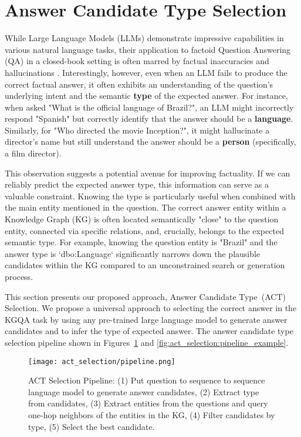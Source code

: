 \section{Answer Candidate Type Selection}
\label{sec:candidate_generation_type_selection}

While Large Language Models (LLMs) demonstrate impressive capabilities in various natural language tasks, their application to factoid Question Answering (QA) in a closed-book setting is often marred by factual inaccuracies and hallucinations \cite{DBLP:conf/emnlp/RobertsRS20, lin-etal-2022-truthfulqa}. Interestingly, however, even when an LLM fails to produce the correct factual answer, it often exhibits an understanding of the question's underlying intent and the semantic \textbf{type} of the expected answer. For instance, when asked "What is the official language of Brazil?", an LLM might incorrectly respond "Spanish" but correctly identify that the answer should be a \textbf{language}. Similarly, for "Who directed the movie Inception?", it might hallucinate a director's name but still understand the answer should be a \textbf{person} (specifically, a film director).

This observation suggests a potential avenue for improving factuality. If we can reliably predict the expected answer type, this information can serve as a valuable constraint. Knowing the type is particularly useful when combined with the main entity mentioned in the question. The correct answer entity within a Knowledge Graph (KG) is often located semantically "close" to the question entity, connected via specific relations, and, crucially, belongs to the expected semantic type. For example, knowing the question entity is "Brazil" and the answer type is `dbo:Language` significantly narrows down the plausible candidates within the KG compared to an unconstrained search or generation process.

This section presents our proposed approach, Answer Candidate Type~(ACT) Selection. We propose a universal approach to selecting the correct answer in the KGQA task by using any pre-trained large language model to generate answer candidates and to infer the type of expected answer. The answer candidate type selection pipeline shown in Figures~\ref{fig:act_selection:pipeline} and \ref{fig:act_selection:pipeline_example}.

\begin{figure}[]
    \centering
    \texttt{[image: act\_selection/pipeline.png]}
    \caption{ACT Selection Pipeline: (1) Put question to sequence to sequence language model to generate answer candidates, (2) Extract type from candidates, (3) Extract entities from the questions and query one-hop neighbors of the entities in the KG, (4) Filter candidates by type, (5) Select the best candidate.}
    \label{fig:act_selection:pipeline}
\end{figure}


